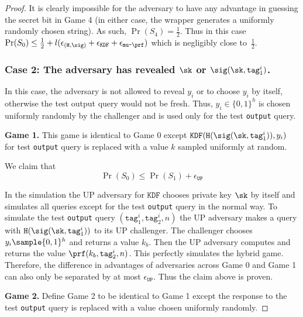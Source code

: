 \documentclass{article}
\begin{document}
{\begin{proof}
It is clearly impossible for the adversary to have any advantage in guessing the secret bit in Game 4 (in either case, the wrapper generates a uniformly randomly chosen string). As such, $\Pr(S_4) = \frac{1}{2}$. Thus in this case $\Pr(S_0) \le \frac{1}{2} + l( \epsilon_{(\texttt{H}, \sig)} + \epsilon_{\texttt{KDF}} + \epsilon_{\texttt{mu-}\prf})$ which is negligibly close to~$\frac{1}{2}$.

\subsubsection*{Case 2: The adversary has revealed $\sk$ or $\sig(\sk, \texttt{tag}_1^i)$.}

In this case, the adversary is not allowed to reveal $y_i$ or to choose $y_i$ by itself, otherwise the test output query would not be fresh. Thus, $y_i \in \{0,1\}^h$ is chosen uniformly randomly by the challenger and is used only for the test \texttt{output} query.  


\noindent \textbf{Game 1.} This game is identical to Game 0 except $\texttt{KDF}(\texttt{H}(\sig (\sk, \texttt{tag}^i_1)), y_i)$ for test \texttt{output} query is replaced with a value $k$ sampled uniformly at random. 

We claim that 		
$$
\Pr(S_0) \le \Pr(S_1) + \epsilon_{\texttt{UP}}
$$

In the simulation the UP adversary for $\texttt{KDF}$ chooses private key $\sk$ by itself and simulates all queries except for the test \texttt{output} query in the normal way. To simulate the test \texttt{output} query $(\texttt{tag}^i_1, \texttt{tag}^i_2, n)$ the UP adversary makes a query with  $\texttt{H}(\sig (\sk, \texttt{tag}^i_1))$ to its UP challenger. The challenger chooses $y_i \sample \{0,1\}^h$ and returns a value $k_b$. Then the UP adversary computes and returns the value $\prf(k_b,\texttt{tag}^i_2, n)$.  This perfectly simulates the hybrid game. Therefore, the difference in advantages of adversaries across Game 0 and Game 1 can also only be separated by at most $\epsilon_{\texttt{UP}}$. Thus the claim above is proven.

\noindent \textbf{Game 2.} Define Game 2 to be identical to Game 1 except the response to the test \texttt{output} query is replaced with a value chosen uniformly randomly.


\end{proof}}
\end{document}
